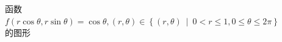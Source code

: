 \documentclass[12pt,UTF8]{ctexart}
\newcommand\Set[2]{\left\{#1\ \middle\vert\ #2 \right\}}
\begin{document}
\begin{enumerate}
\begin{figure}[H]
\begin{center}
\end{center}
\caption{函数$f(r\cos\theta,r\sin\theta)=\cos\theta,(r,\theta)\in\Set{(r,\theta)}{0<r\leqslant1,0\leqslant\theta\leqslant2\pi}$的图形}
\label{costheta}
\end{figure}

\end{enumerate}
\end{document}

